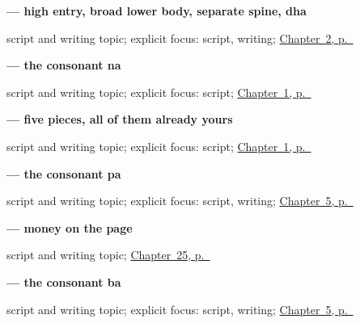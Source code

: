 \noindent\begin{minipage}[t]{\linewidth}
\raggedright
\textbf{ — high entry, broad lower body, separate spine, dha}\par
\footnotesize script and writing topic; explicit focus: script, writing; \hyperref[ch:greetings]{Chapter~2, p.~\pageref*{ch:greetings}}
\end{minipage}\par\smallskip

\noindent\begin{minipage}[t]{\linewidth}
\raggedright
\textbf{ — the consonant na}\par
\footnotesize script and writing topic; explicit focus: script; \hyperref[ch:first-greeting-script]{Chapter~1, p.~\pageref*{ch:first-greeting-script}}
\end{minipage}\par\smallskip

\noindent\begin{minipage}[t]{\linewidth}
\raggedright
\textbf{ — five pieces, all of them already yours}\par
\footnotesize script and writing topic; explicit focus: script; \hyperref[ch:first-greeting-script]{Chapter~1, p.~\pageref*{ch:first-greeting-script}}
\end{minipage}\par\smallskip

\noindent\begin{minipage}[t]{\linewidth}
\raggedright
\textbf{ — the consonant pa}\par
\footnotesize script and writing topic; explicit focus: script, writing; \hyperref[ch:gu-first-use-forms-b]{Chapter~5, p.~\pageref*{ch:gu-first-use-forms-b}}
\end{minipage}\par\smallskip

\noindent\begin{minipage}[t]{\linewidth}
\raggedright
\textbf{ — money on the page}\par
\footnotesize script and writing topic; \hyperref[ch:gu-hand-money-map]{Chapter~25, p.~\pageref*{ch:gu-hand-money-map}}
\end{minipage}\par\smallskip

\noindent\begin{minipage}[t]{\linewidth}
\raggedright
\textbf{ — the consonant ba}\par
\footnotesize script and writing topic; explicit focus: script, writing; \hyperref[ch:gu-first-use-forms-b]{Chapter~5, p.~\pageref*{ch:gu-first-use-forms-b}}
\end{minipage}\par\smallskip

